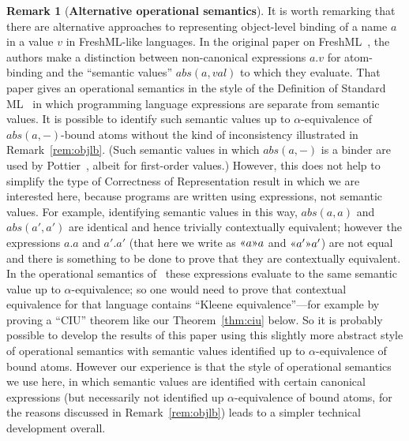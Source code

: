 \documentclass{LMCS}
\theoremstyle{plain}
\theoremstyle{definition}
\newtheorem{remark}[thm]{Remark}
\newcommand{\atm}[1][a]{#1}
\newcommand{\BINDVAL}[2]{\mathopen{\text{\normalfont\guillemotleft}}#1
  \mathclose{\text{\normalfont\guillemotright}}#2}
\newcommand{\val}[1][v]{#1}
\begin{document}
\begin{remark}[\textbf{Alternative operational semantics}]
  \label{rem:altos}
  It is worth remarking that there are alternative approaches to
  representing object-level binding of a name $\atm$ in a value $\val$
  in FreshML-like languages. In the original paper on
  FreshML~\cite{PittsAM:metpbn}, the authors make a distinction
  between non-canonical expressions $\atm.\val$ for atom-binding and
  the ``semantic values'' $\mathit{abs}(\atm,val)$ to which they
  evaluate. That paper gives an operational semantics in the style of
  the Definition of Standard ML~\cite{MilnerR:defsmr} in which
  programming language expressions are separate from semantic
  values. It is possible to identify such semantic values up to
  $\alpha$-equivalence of $\mathit{abs}(\atm, {-})$-bound atoms
  without the kind of inconsistency illustrated in
  Remark~\ref{rem:objlb}. (Such semantic values in which
  $\mathit{abs}(\atm,{-})$ is a binder are used by
  Pottier~\cite{PottierF:stancf}, albeit for first-order values.)
  However, this does not help to simplify the type of Correctness of
  Representation result in which we are interested here, because
  programs are written using expressions, not semantic values. For
  example, identifying semantic values in this way,
  $\mathit{abs}(\atm,\atm)$ and $\mathit{abs}(\atm',\atm')$ are
  identical and hence trivially contextually equivalent; however the
  expressions $\atm.\atm$ and $\atm'.\atm'$ (that here we write as
  $\BINDVAL{\atm}{\atm}$ and $\BINDVAL{\atm'}{\atm'}$) are not equal
  and there is something to be done to prove that they are
  contextually equivalent. In the operational semantics
  of~\cite{PittsAM:metpbn} these expressions evaluate to the same
  semantic value up to $\alpha$-equivalence; so one would need to
  prove that contextual equivalence for that language contains
  ``Kleene equivalence''---for example by proving a ``CIU'' theorem
  like our Theorem~\ref{thm:ciu} below. So it is probably possible to
  develop the results of this paper using this slightly more abstract
  style of operational semantics with semantic values identified up to
  $\alpha$-equivalence of bound atoms. However our experience is that
  the style of operational semantics we use here, in which semantic
  values are identified with certain canonical expressions (but
  necessarily not identified up $\alpha$-equivalence of bound atoms,
  for the reasons discussed in Remark~\ref{rem:objlb}) leads to a
  simpler technical development overall.
\end{remark}
\end{document}
